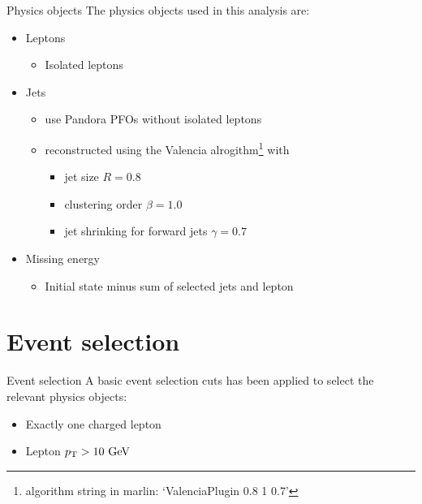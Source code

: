 \documentclass{beamer}
\begin{document}
\begin{frame}{Physics objects}
The physics objects used in this analysis are:
\begin{itemize}
  \item Leptons
  \begin{itemize}
    \item Isolated leptons
  \end{itemize}
  \item Jets
  \begin{itemize}
    \item use Pandora PFOs without isolated leptons
    \item reconstructed using the Valencia alrogithm\footnote{algorithm string in marlin: `ValenciaPlugin 0.8 1 0.7'} with
    \begin{itemize}
      \item jet size $R=0.8$
      \item clustering order $\beta=1.0$
      \item jet shrinking for forward jets $\gamma=0.7$
    \end{itemize}
  \end{itemize}
  \item Missing energy
  \begin{itemize}
    \item Initial state minus sum of selected jets and lepton
  \end{itemize}
\end{itemize}
\end{frame}











\section{Event selection}

\begin{frame}{Event selection}
A basic event selection cuts has been applied to select the relevant physics objects:
\begin{itemize}
\item Exactly one charged lepton
\item Lepton $p_\mathrm{T} > 10~\mathrm{GeV}$
\end{itemize}
\end{frame}
\end{document}
